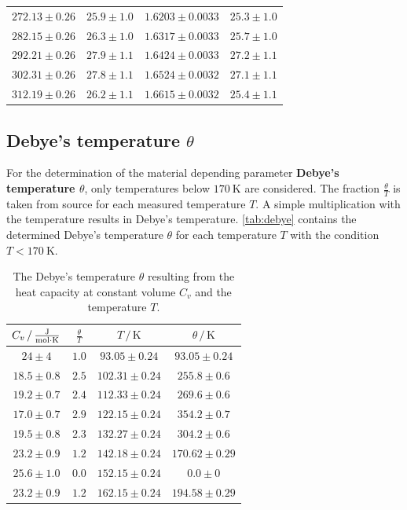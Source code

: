 \begin{table}
\begin{tabular}{c c c c}
        $272.13\pm0.26$ & $25.9\pm1.0$ & $1.6203\pm0.0033$ & $25.3\pm1.0$ \\
        $282.15\pm0.26$ & $26.3\pm1.0$ & $1.6317\pm0.0033$ & $25.7\pm1.0$ \\
        $292.21\pm0.26$ & $27.9\pm1.1$ & $1.6424\pm0.0033$ & $27.2\pm1.1$ \\
        $302.31\pm0.26$ & $27.8\pm1.1$ & $1.6524\pm0.0032$ & $27.1\pm1.1$ \\
        $312.19\pm0.26$ & $26.2\pm1.1$ & $1.6615\pm0.0032$ & $25.4\pm1.1$ \\
        \bottomrule
    \end{tabular}
\end{table}
\FloatBarrier

\subsection{Debye's temperature \texorpdfstring{$\theta$}{theta}}
For the determination of the material depending parameter \textbf{Debye's temperature $\theta$}, only temperatures below $\qty{170}{\kelvin}$ are considered.
The fraction $\frac{\theta}{T}$ is taken from source \cite{V47} for each measured temperature $T$.
A simple multiplication with the temperature results in Debye's temperature.
\autoref{tab:debye} contains the determined Debye's temperature $\theta$ for each temperature $T$ with the condition $T < \qty{170}{\kelvin}$. 
\begin{table}
    \centering
    \caption{The Debye's temperature $\theta$ resulting from the heat capacity at constant volume $C_v$ and the temperature $T$.}
    \label{tab:debye}
    \begin{tabular}{c c c c}
        \toprule
        $C_v \,/\, \unit{\frac{\joule}{\mol \cdot \kelvin}}$ & $\frac{\theta}{T}$ & $T \,/\, \unit{\kelvin}$ & $\theta \,/\, \unit{\kelvin}$ \\
        \midrule
        $24\pm4$ & $1.0$ & $93.05\pm0.24$ & $93.05\pm0.24$ \\
        $18.5\pm0.8$ & $2.5$ & $102.31\pm0.24$ & $255.8\pm0.6$ \\
        $19.2\pm0.7$ & $2.4$ & $112.33\pm0.24$ & $269.6\pm0.6$ \\
        $17.0\pm0.7$ & $2.9$ & $122.15\pm0.24$ & $354.2\pm0.7$ \\
        $19.5\pm0.8$ & $2.3$ & $132.27\pm0.24$ & $304.2\pm0.6$ \\
        $23.2\pm0.9$ & $1.2$ & $142.18\pm0.24$ & $170.62\pm0.29$ \\
        $25.6\pm1.0$ & $0.0$ & $152.15\pm0.24$ & $0.0\pm0$ \\
        $23.2\pm0.9$ & $1.2$ & $162.15\pm0.24$ & $194.58\pm0.29$ \\
        \bottomrule
    \end{tabular}
\end{table}